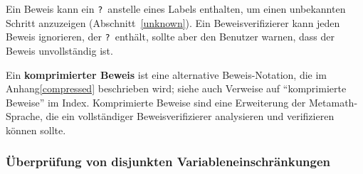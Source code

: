 
Ein Beweis kann ein \texttt{?}\ anstelle eines Labels enthalten, um einen unbekannten Schritt anzuzeigen (Abschnitt~\ref{unknown}).  Ein Beweisverifizierer kann jeden Beweis ignorieren, der \texttt{?}\ enthält, sollte aber den Benutzer warnen, dass der Beweis unvollständig ist.

Ein {\bf komprimierter Beweis} ist eine alternative Beweis-Notation, die im Anhang\ref{compressed} beschrieben wird; siehe auch Verweise auf "`komprimierte Beweise"' im Index.  Komprimierte Beweise sind eine Erweiterung der Metamath-Sprache, die ein vollständiger Beweisverifizierer analysieren und verifizieren können sollte.

\subsubsection{Überprüfung von disjunkten Variableneinschränkungen}

